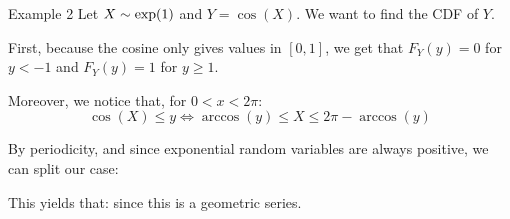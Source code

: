 \documentclass[a4paper]{article}
\begin{document}
\begin{parag}{Example 2}
    Let $X \followsdistr \exp\left(1\right)$ and $Y = \cos\left(X\right)$. We want to find the CDF of $Y$.

    First, because the cosine only gives values in $\left[0, 1\right]$, we get that $F_Y\left(y\right) = 0$ for $y < -1$ and $F_Y\left(y\right) = 1$ for $y \geq 1$.

    Moreover, we notice that, for $0 < x < 2\pi$: 
    \[\cos\left(X\right) \leq y \iff \arccos\left(y\right) \leq X \leq 2\pi - \arccos\left(y\right)\]
    
    By periodicity, and since exponential random variables are always positive, we can split our case: 
    
    This yields that: 
    since this is a geometric series.

\end{parag}
\end{document}
